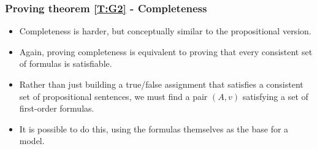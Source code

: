 \documentclass[handout]{beamer}
\begin{document}
\begin{frame}
\frametitle{Proving theorem \ref{T:G2} - Completeness}
\begin{itemize}
\item Completeness is harder, but conceptually similar to the propositional version.
\vspace{0.5cm}
\item Again, proving completeness is equivalent to proving that every consistent set of formulas is satisfiable.
\vspace{0.5cm}
\item Rather than just building a true/false assignment that satisfies a consistent set of propositional sentences, we must find a pair $(A,v)$ satisfying a set of first-order formulas.
\vspace{0.5cm}
\item It is possible to do this, using the formulas themselves as the base for a model. 
\end{itemize}
\end{frame}
\end{document}
